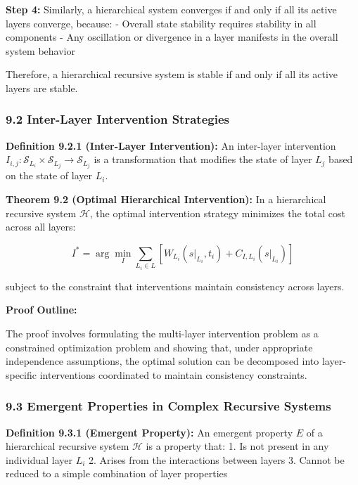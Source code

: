 \documentclass[
]{article}
\begin{document}
\textbf{Step 4:} Similarly, a hierarchical system converges if and only
if all its active layers converge, because: - Overall state stability
requires stability in all components - Any oscillation or divergence in
a layer manifests in the overall system behavior

Therefore, a hierarchical recursive system is stable if and only if all
its active layers are stable.

\subsubsection{9.2 Inter-Layer Intervention
Strategies}\label{inter-layer-intervention-strategies}

\textbf{Definition 9.2.1 (Inter-Layer Intervention):} An inter-layer
intervention
\(I_{i,j}: \mathcal{S}_{L_i} \times \mathcal{S}_{L_j} \rightarrow \mathcal{S}_{L_j}\)
is a transformation that modifies the state of layer \(L_j\) based on
the state of layer \(L_i\).

\textbf{Theorem 9.2 (Optimal Hierarchical Intervention):} In a
hierarchical recursive system \(\mathcal{H}\), the optimal intervention
strategy minimizes the total cost across all layers:

\[I^* = \arg\min_I \sum_{L_i \in L} [W_{L_i}(s|_{L_i}, t_i) + C_{I,L_i}(s|_{L_i})]\]

subject to the constraint that interventions maintain consistency across
layers.

\textbf{Proof Outline:}

The proof involves formulating the multi-layer intervention problem as a
constrained optimization problem and showing that, under appropriate
independence assumptions, the optimal solution can be decomposed into
layer-specific interventions coordinated to maintain consistency
constraints.

\subsubsection{9.3 Emergent Properties in Complex Recursive
Systems}\label{emergent-properties-in-complex-recursive-systems}

\textbf{Definition 9.3.1 (Emergent Property):} An emergent property
\(E\) of a hierarchical recursive system \(\mathcal{H}\) is a property
that: 1. Is not present in any individual layer \(L_i\) 2. Arises from
the interactions between layers 3. Cannot be reduced to a simple
combination of layer properties
\end{document}
